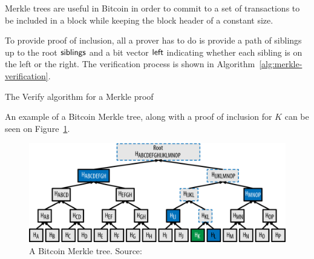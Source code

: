 Merkle trees are useful in Bitcoin in order to commit to a set of transactions to be included in a block while keeping the block header of a constant size.

To provide proof of inclusion, all a prover has to do is provide a path of siblings up to the root $\sf{siblings}$ and a bit vector $\sf{left}$ indicating whether each sibling is on the left or the right. The verification process is shown in Algorithm~\ref{alg:merkle-verification}.

\begin{algorithm}[H]
  \caption{\label{alg:merkle-verification}The \textsf{Verify} algorithm
    for a Merkle proof}
    \begin{algorithmic}[1]
              \Else
              \EndIf
            \EndWhile
            \State{}
        \EndFunction
    \end{algorithmic}
\end{algorithm}

An example of a Bitcoin Merkle tree, along with a proof of inclusion for $K$ can be seen on Figure~\ref{fig:merkletree}.

\begin{figure}
  \centering
  \includegraphics[width=0.9\columnwidth,keepaspectratio]{figures/merkle-tree-proof.png}
  \caption{A Bitcoin Merkle tree. Source:~\cite{mastering}}
  \label{fig:merkletree}
\end{figure}

